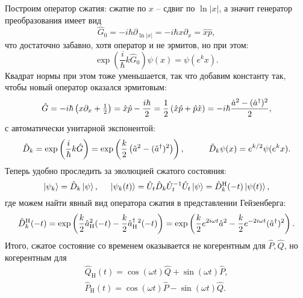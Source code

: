 Построим оператор сжатия: сжатие по $x$ -- сдвиг по $\ln |x|$, а значит генератор преобразования имеет вид
\begin{equation*}
    \hat{G}_0 = - i \hbar \partial_{\ln |x|} = - i \hbar x \partial_x = \hat{x} \hat{p},
\end{equation*}
что достаточно забавно, хотя оператор и не эрмитов, но при этом:
\begin{equation*}
    \exp\left(\frac{i}{\hbar} k \hat{G}_0 \right) \psi(x) = \psi(e^k x).
\end{equation*}
Квадрат нормы при этом тоже уменьшается, так что добавим константу так, чтобы новый оператор оказался эрмитовым:
\begin{equation*}
    \hat{G} = - i \hbar \left(x \partial_x + \tfrac{1}{2}\right) = \hat{x} \hat{p} - \frac{i \hbar}{2} = \frac{1}{2} \left(\hat{x} \hat{p} + \hat{p} \hat{x}\right) = - i \hbar \frac{\hat{a}^2 - (\hat{a}^{\dag})^2}{2},
\end{equation*}
с автоматически унитарной экспонентой:
\begin{equation*}
    \hat{D}_k = \exp\left(\frac{i}{\hbar} k \hat{G}\right) = \exp\left(
        \frac{k}{2} \left(\hat{a}^2 - (\hat{a}\con)^2\right)
    \right),
    \hspace{10 mm}  
    \hat{D}_k \psi(x) = e^{k/2}\psi(e^k x).
\end{equation*}
Теперь удобно проследить за эволюцией сжатого состояния:
\begin{equation*}
    \left| \psi_k \right\rangle = \hat{D}_k \left| \psi \right\rangle,
    \hspace{5 mm} 
    \left| \psi_k (t) \right\rangle = \hat{U}_t \hat{D}_k \hat{U}_{t}^{-1} \hat{U}_t \left| \psi \right\rangle = \hat{D}_k^{\text{H}} (-t) \left| \psi(t) \right\rangle,
\end{equation*}
где можем найти явный вид оператора сжатия в представлении Гейзенберга:
\begin{equation*}
    \hat{D}_k^{\text{H}} (-t) = \exp \left(
        \frac{k}{2} \hat{a}_{\text{H}}^2(-t) - \frac{k}{2} \hat{a}^{\dag}_{\text{H}}{}^2 (-t)
    \right) = \exp  \left(
       \frac{k}{2} e^{2 i \omega t} \hat{a}^2 - \frac{k}{2} e^{-2 i \omega t} (\hat{a}^{\dag})^2
    \right).
\end{equation*}
Итого, сжатое состояние со временем оказывается не когерентным для $\hat{P}, \hat{Q}$, но когерентным для
\begin{align*}
    \hat{Q}_{\text{H}} (t) = \cos (\omega t) \hat{Q} + \sin(\omega t) \hat{P}, \\
    \hat{P}_{\text{H}} (t) = \cos (\omega t) \hat{P} -\sin (\omega t) \hat{Q}.
\end{align*}


